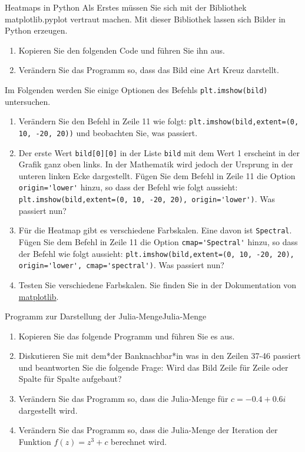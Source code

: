 \begin{LA}
{Heatmaps in Python}{}
Als Erstes müssen Sie sich mit der Bibliothek matplotlib.pyplot vertraut machen. Mit dieser Bibliothek lassen sich Bilder in Python erzeugen.
\begin{enumerate}
    \item Kopieren Sie den folgenden Code und führen Sie ihn aus.
    
    \item Verändern Sie das Programm so, dass das Bild eine Art Kreuz darstellt.
\end{enumerate}

Im Folgenden werden Sie einige Optionen des Befehls \lstinline|plt.imshow(bild)| untersuchen.
\begin{enumerate} [resume]
    \item Verändern Sie den Befehl in Zeile 11 wie folgt: \lstinline|plt.imshow(bild,extent=(0, 10, -20, 20))| und beobachten Sie, was passiert.
    \item Der erste Wert \lstinline|bild[0][0]| in der Liste \lstinline|bild| mit dem Wert 1 erscheint in der Grafik ganz oben links. In der Mathematik wird jedoch der Ursprung in der unteren linken Ecke dargestellt. Fügen Sie dem Befehl in Zeile 11 die Option \lstinline|origin='lower'| hinzu, so dass der Befehl wie folgt aussieht: \lstinline|plt.imshow(bild,extent=(0, 10, -20, 20), origin='lower')|. Was passiert nun?
    \item Für die Heatmap gibt es verschiedene Farbskalen. Eine davon ist \lstinline|Spectral|. Fügen Sie dem Befehl in Zeile 11 die Option \lstinline|cmap='Spectral'| hinzu, so dass der Befehl wie folgt aussieht: \lstinline|plt.imshow(bild,extent=(0, 10, -20, 20), origin='lower', cmap='spectral')|. Was passiert nun?
    \item Testen Sie verschiedene Farbskalen. Sie finden Sie in der Dokumentation von \href{https://matplotlib.org/stable/users/explain/colors/colormaps.html}{matplotlib}.
\end{enumerate}

\end{LA}

\begin{LA}
{Programm zur Darstellung der Julia-Menge}{Julia-Menge}
\begin{enumerate}
    \item 
Kopieren Sie das folgende Programm und führen Sie es aus.

\item Diskutieren Sie mit dem*der Banknachbar*in was in den Zeilen 37-46 passiert und beantworten Sie die folgende Frage: Wird das Bild Zeile für Zeile oder Spalte für Spalte aufgebaut?
\item Verändern Sie das Programm so, dass die Julia-Menge für $c = -0.4 + 0.6i$ dargestellt wird.
\item Verändern Sie das Programm so, dass die Julia-Menge der Iteration der Funktion $f(z) = z^3 + c$ berechnet wird.
\end{enumerate}
\end{LA}

